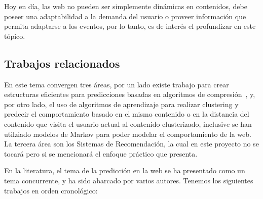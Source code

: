 \documentclass{udparticle}
\begin{document}
  Hoy en día, las web no pueden ser simplemente dinámicas en contenidos, debe poseer una adaptabilidad a la demanda del usuario o proveer información que permita adaptarse a los eventos, por lo tanto, es de interés el profundizar en este tópico.


\subsection{Trabajos relacionados}

En este tema convergen tres áreas, por un lado existe trabajo para crear estructuras eficientes para predicciones basadas en algoritmos de compresión~\cite{BWT}, y, por otro lado, el uso de algoritmos de aprendizaje para realizar clustering 
y predecir el comportamiento basado en el mismo contenido o en la distancia del contenido que visita el usuario actual al contenido clusterizado, inclusive se han utilziado modelos de Markov para poder modelar el comportamiento de la web.
La tercera área son los Sistemas de Recomendación, la cual en este proyecto no se tocará pero si se mencionará el enfoque práctico que presenta.


En la literatura, el tema de la predicción en la web se ha presentado como un tema concurrente, y ha sido abarcado por varios autores. 
Tenemos los siguientes trabajos en orden cronológico:
\end{document}
